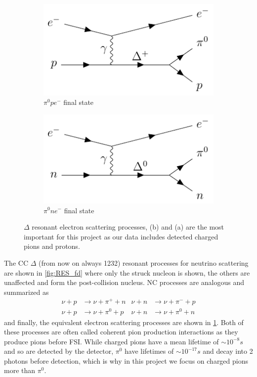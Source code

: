 \documentclass[a4paper,12pt]{article}
\begin{document}
\begin{figure}[H]
    \begin{subfigure}[b]{0.45\textwidth}
        \centering
        \includegraphics{figures/fds/RESel3.pdf}
        \caption{
            $\pi^0pe^-$ final state
        }
    \end{subfigure}
    \begin{subfigure}[b]{0.45\textwidth}
        \centering
        \includegraphics{figures/fds/RESel4.pdf}
        \caption{
            $\pi^0ne^-$ final state
        }
    \end{subfigure}
    \caption{
        $\Delta$ resonant electron scattering processes, (b) and (a) are the most important for this project as our data includes detected charged pions and protons.
    }\label{fig:RESel_fd}
\end{figure}

The CC $\Delta$ (from now on always 1232) resonant processes for neutrino scattering are shown in \cref{fig:RES_fd} where only the struck nucleon is shown, the others are unaffected and form the post-collision nucleus.
NC processes are analogous and summarized as
\begin{align}
    \nu + p &\rightarrow \nu + \pi^+ + n & \nu + n &\rightarrow \nu + \pi^- + p \\
    \nu + p &\rightarrow \nu + \pi^0 + p & \nu + n &\rightarrow \nu + \pi^0 + n
\end{align}
and finally, the equivalent electron scattering processes are shown in \cref{fig:RESel_fd}.
Both of these processes are often called coherent pion production interactions as they produce pions before FSI.
While charged pions have a mean lifetime of $\sim 10^{-8} \si{s}$ and so are detected by the detector, $\pi^0$ have lifetimes of $\sim 10^{-17} \si{s}$ \cite{particledatagroupReviewParticlePhysics2022} and decay into 2 photons before detection, which is why in this project we focus on charged pions more than $\pi^0$.
\end{document}
